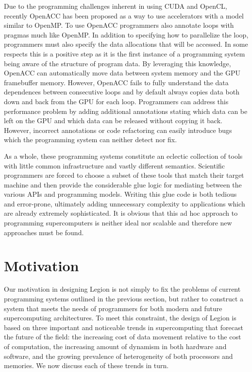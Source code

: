 Due to the programming challenges inherent
in using CUDA and OpenCL, recently OpenACC \cite{OpenACC}
has been proposed as a way to use accelerators 
with a model similar to OpenMP. To use OpenACC
programmers also annotate loops with 
pragmas much like OpenMP.  In addition
to specifying how to parallelize the loop, 
programmers must also specify the data allocations
that will be accessed. In some respects 
this is a positive step as it is the first instance 
of a programming system being aware of the 
structure of program data. By leveraging this
knowledge, OpenACC can automatically move
data between system memory and the GPU framebuffer
memory. However, OpenACC fails to fully understand
the data dependences between consecutive loops
and by default always copies data both down
and back from the GPU for each loop. Programmers
can address this performance problem by adding
additional annotations stating which data
can be left on the GPU and which data can
be released without copying it back. However,
incorrect annotations or code refactoring
can easily introduce bugs which the
programming system can neither detect nor fix.

As a whole, these programming systems constitute
an eclectic collection of tools with little
common infrastructure and vastly different semantics.
Scientific programmers are forced to choose
a subset of these tools that match their target
machine and then provide the considerable glue logic
for mediating between the various APIs and programming
models. Writing this glue code is both tedious and 
error-prone, ultimately adding unnecessary complexity 
to applications which are already extremely sophisticated. 
It is obvious that this ad hoc approach to programming 
supercomputers is neither ideal nor scalable and 
therefore new approaches must be found.

\section{Motivation}
\label{sec:motivation}

Our motivation in designing Legion is not simply to fix
the problems of current programming systems outlined in
the previous section, but rather to construct a system
that meets the needs of programmers for both modern and
future supercomputing architectures. To meet this 
constraint, the design of Legion is based on three 
important and noticeable trends in supercomputing that
forecast the future of the field: the increasing cost 
of data movement relative to the cost of computation, 
the increasing amount of dynamism in both hardware and 
software, and the growing prevalence of heterogeneity 
of both processors and memories. We now discuss each of
these trends in turn.

